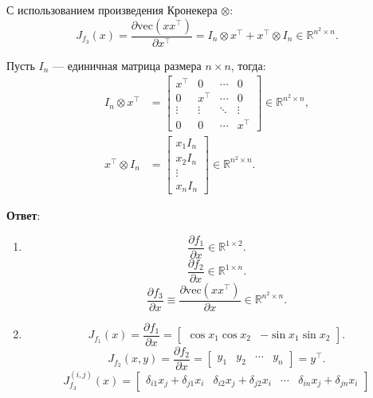 \documentclass[pract]{SCWorks}
\begin{document}
    С использованием произведения Кронекера $\otimes$:
    \[
    \boxed{J_{f_3}(x) = \frac{\partial \mathrm{vec}(xx^\top)}{\partial x^\top} = I_n \otimes x^\top + x^\top \otimes I_n \in \mathbb{R}^{n^2 \times n}}.
    \]

    Пусть $I_n$ — единичная матрица размера $n \times n$, тогда:
    \[
    \begin{aligned}
    I_n \otimes x^\top &=
    \begin{bmatrix}
    x^\top & 0 & \cdots & 0 \\
    0 & x^\top & \cdots & 0 \\
    \vdots & \vdots & \ddots & \vdots \\
    0 & 0 & \cdots & x^\top
    \end{bmatrix} \in \mathbb{R}^{n^2 \times n}, \\
    x^\top \otimes I_n &=
    \begin{bmatrix}
    x_1 I_n \\
    x_2 I_n \\
    \vdots \\
    x_n I_n
    \end{bmatrix} \in \mathbb{R}^{n^2 \times n}.
    \end{aligned}
    \]

    \textbf{Ответ}:
    \begin{enumerate}[label=\alph*)]
        \item
        \[
        \boxed{\frac{\partial f_1}{\partial x} \in \mathbb{R}^{1 \times 2}}.
        \]
        \[
        \boxed{\frac{\partial f_2}{\partial x} \in \mathbb{R}^{1 \times n}}.
        \]
        \[
        \boxed{\frac{\partial f_3}{\partial x} \equiv \frac{\partial \mathrm{vec}(xx^\top)}{\partial x} \in \mathbb{R}^{n^2 \times n}}.
        \]
        \item
        \[
        \boxed{J_{f_1}(x) = \frac{\partial f_1}{\partial x} =
        \begin{bmatrix}
        \cos x_1 \cos x_2 & -\sin x_1 \sin x_2
        \end{bmatrix}}.
        \]
        \[
        \boxed{J_{f_2}(x, y) = \frac{\partial f_2}{\partial x} =
        \begin{bmatrix}
        y_1 & y_2 & \cdots & y_n
        \end{bmatrix} = y^\top}.
        \]
        \[
            \boxed{
        J_{f_3}^{(i,j)}(x) =
        \begin{bmatrix}
        \delta_{i1} x_j + \delta_{j1} x_i &
        \delta_{i2} x_j + \delta_{j2} x_i &
        \cdots &
        \delta_{in} x_j + \delta_{jn} x_i
        \end{bmatrix}
            }
        \]
    \end{enumerate}
\end{document}
